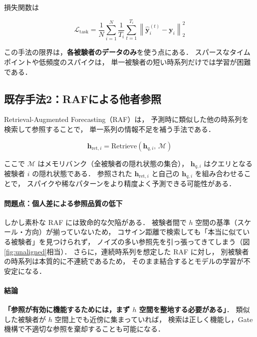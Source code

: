 \documentclass[12pt, a4paper]{ltjsarticle}
\begin{document}
\noindent
損失関数は

\begin{equation}
  \mathcal{L}_{\text{task}}
  = \frac{1}{N} \sum_{i=1}^{N} \frac{1}{T_i} \sum_{t=1}^{T_i}
    \left\|\hat{\bm{y}}_i^{(t)} - \bm{y}_i\right\|_2^2
  \label{eq:ltask}
\end{equation}

\noindent
この手法の限界は，\textbf{各被験者のデータのみ}を使う点にある．
スパースなタイムポイントや低頻度のスパイクは，
単一被験者の短い時系列だけでは学習が困難である．

\subsection{既存手法2：RAFによる他者参照}

Retrieval-Augmented Forecasting（RAF）は，
予測時に類似した他の時系列を検索して参照することで，
単一系列の情報不足を補う手法である．

\begin{equation}
  \bm{h}_{\text{ret},i} = \mathrm{Retrieve}\!\left(\bm{h}_{q,i},\, \mathcal{M}\right)
  \label{eq:retrieve}
\end{equation}

\noindent
ここで $\mathcal{M}$ はメモリバンク（全被験者の隠れ状態の集合），
$\bm{h}_{q,i}$ はクエリとなる被験者 $i$ の隠れ状態である．
参照された $\bm{h}_{\text{ret},i}$ と自己の $\bm{h}_{q,i}$ を組み合わせることで，
スパイクや稀なパターンをより精度よく予測できる可能性がある．

\paragraph{問題点：個人差による参照品質の低下}
しかし素朴な RAF には致命的な欠陥がある．
被験者間で $h$ 空間の基準（スケール・方向）が揃っていないため，
コサイン距離で検索しても「本当に似ている被験者」を見つけられず，
ノイズの多い参照先を引っ張ってきてしまう（図\ref{fig:unaligned}相当）．
さらに，連続時系列を想定した RAF に対し，
別被験者の時系列は本質的に不連続であるため，
そのまま結合するとモデルの学習が不安定になる．

\paragraph{結論}
\textbf{「参照が有効に機能するためには，まず $h$ 空間を整地する必要がある」}．
類似した被験者が $h$ 空間上でも近傍に集まっていれば，
検索は正しく機能し，Gate 機構で不適切な参照を棄却することも可能になる．
\end{document}
